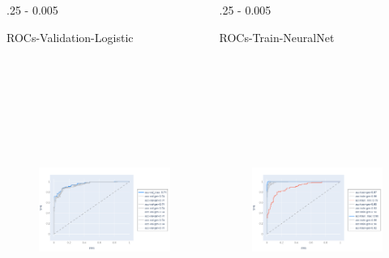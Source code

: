\documentclass{postertheme}\usepackage[]{graphicx}\usepackage[]{color}
\begin{document}
\begin{frame}
\begin{columns}[onlytextwidth]
\begin{column}{.25 \textwidth - 0.005 \textwidth}
\begin{block}{ROCs-Validation-Logistic}
      \begin{figure}
        \includegraphics[width=18cm, height=10cm, keepaspectratio=true]{figures/plot-rocs-logistic-val.png}
      \end{figure}
        
    \end{block}
  \end{column}
  
  \begin{column}{.25 \textwidth - 0.005 \textwidth}
    \begin{block}{ROCs-Train-NeuralNet}
        
      \begin{figure}
        \includegraphics[width=18cm, height=10cm, keepaspectratio=true]{figures/plot-rocs-mlp-train.png}
      \end{figure}
        

\end{block}
\end{column}
\end{columns}
\end{frame}
\end{document}

